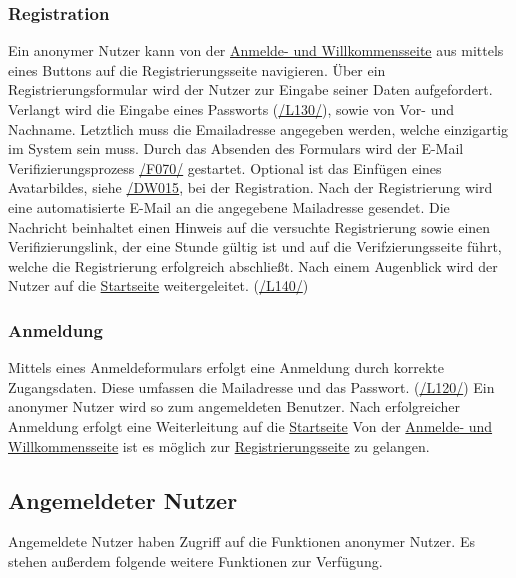 \subsubsection{Registration}\label{an:reg}
\begin{description}
     Ein anonymer Nutzer kann von der \hyperref[an:log]{Anmelde- und Willkommensseite} aus mittels eines
    Buttons auf die Registrierungsseite navigieren.
     Über ein Registrierungsformular wird der Nutzer zur Eingabe seiner
    Daten aufgefordert. Verlangt wird die Eingabe eines Passworts (\hyperref[leist:130]{/L130/}),
    sowie von Vor- und Nachname. Letztlich muss die Emailadresse
    angegeben werden, welche einzigartig im System sein muss. Durch das Absenden des Formulars wird der E-Mail Verifizierungsprozess
    \hyperref[funkt:070]{/F070/} gestartet.
     Optional ist das Einfügen eines Avatarbildes, siehe \hyperref[d015]{/DW015},
    bei der Registration.
     Nach der Registrierung wird eine automatisierte E-Mail
    an die angegebene Mailadresse gesendet. Die Nachricht beinhaltet einen Hinweis auf
    die versuchte Registrierung sowie einen Verifizierungslink, der eine Stunde gültig ist und auf die Verifzierungsseite führt, welche
    die Registrierung erfolgreich abschließt. Nach einem Augenblick wird der Nutzer
    auf die \hyperref[nut:start]{Startseite} weitergeleitet. (\hyperref[leist:140]{/L140/})
\end{description}

\subsubsection{Anmeldung}\label{an:log}
\begin{description}
     Mittels eines Anmeldeformulars erfolgt eine Anmeldung durch korrekte Zugangsdaten.
    Diese umfassen die Mailadresse und das Passwort. (\hyperref[leist:120]{/L120/})
    Ein anonymer Nutzer wird so zum angemeldeten Benutzer.
    Nach erfolgreicher Anmeldung erfolgt eine Weiterleitung auf die \hyperref[nut:start]{Startseite}
     Von der \hyperref[an:log]{Anmelde- und Willkommensseite} ist es möglich zur \hyperref[an:reg]{Registrierungsseite} zu gelangen.
\end{description}

\subsection{Angemeldeter Nutzer}
Angemeldete Nutzer haben Zugriff auf die Funktionen anonymer Nutzer.
Es stehen außerdem folgende weitere Funktionen zur Verfügung.

